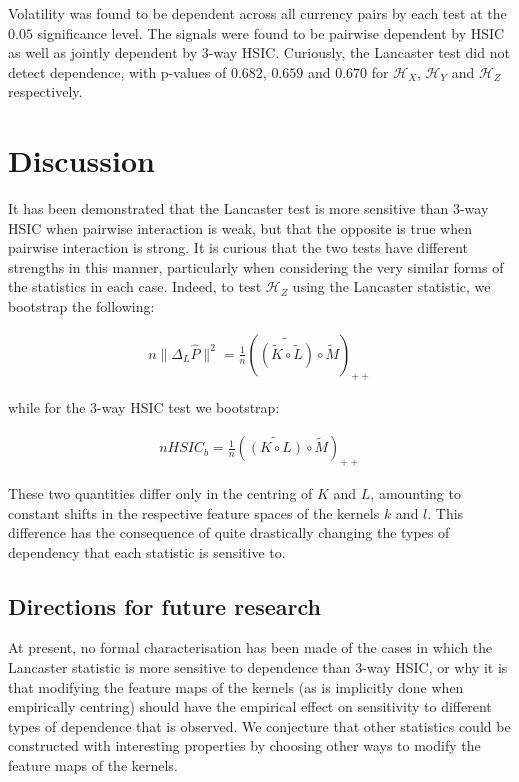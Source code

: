 \documentclass[]{article}
\begin{document}
Volatility was found to be dependent across all currency pairs by each test at the $0.05$ significance level. The signals were found to be pairwise dependent by HSIC as well as jointly dependent by 3-way HSIC. Curiously, the Lancaster test did not detect dependence, with p-values of $0.682$, $0.659$ and $0.670$ for $\mathcal{H}_X$, $\mathcal{H}_Y$ and $\mathcal{H}_Z$ respectively.


\section{Discussion}

It has been demonstrated that the Lancaster test is more sensitive than 3-way HSIC when pairwise interaction is weak, but that the opposite is true when pairwise interaction is strong. It is curious that the two tests have different strengths in this manner, particularly when considering the very similar forms of the statistics in each case. Indeed, to test $\mathcal{H}_Z$ using the Lancaster statistic, we bootstrap the following:

\begin{align*}
n\|\Delta_L\hat{P}\|^2 = \frac{1}{n}\left(\widetilde{\left( \tilde{K} \circ \tilde{L}\right) }\circ \tilde{M} \right)_{++}
\end{align*}

while for the 3-way HSIC test we bootstrap:

\begin{align*}
nHSIC_b = \frac{1}{n}\left(\widetilde{\left( K \circ L\right) }\circ \tilde{M} \right)_{++}
\end{align*}

These two quantities differ only in the centring of $K$ and $L$, amounting to constant shifts in the respective feature spaces of the kernels $k$ and $l$. This difference has the consequence of quite drastically changing the types of dependency that each statistic is sensitive to.

\subsection{Directions for future research}

At present, no formal characterisation has been made of the cases in which the Lancaster statistic is more sensitive to dependence than 3-way HSIC, or why it is that modifying the feature maps of the kernels (as is implicitly done when empirically centring) should have the empirical effect on sensitivity to different types of dependence that is observed. We conjecture that other statistics could be constructed with interesting properties by choosing other ways to modify the feature maps of the kernels.
\end{document}
